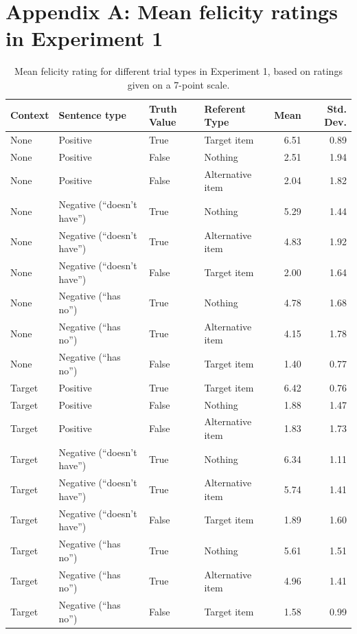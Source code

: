 \documentclass[man, noapacite]{apa2}
\begin{document}
\setlength{\bibleftmargin}{.125in}
\setlength{\bibindent}{-\bibleftmargin}



\newpage
\theappendix

\section{Appendix A: Mean felicity ratings in Experiment 1}\label{appendix:exp1}

\begin{table}[h!]
\caption{\label{tab:m1} Mean felicity rating for different trial types in Experiment 1, based on ratings given on a 7-point scale.}
\begin{center}
\small\addtolength{\tabcolsep}{-5pt}
\begin{tabular}{llllrr}
 \hline
 Context & Sentence type & Truth Value & Referent Type & Mean & Std. Dev. \\
 \hline
 None & Positive & True & Target item & 6.51 & 0.89\\
 None & Positive & False & Nothing & 2.51 & 1.94\\
 None & Positive & False & Alternative item & 2.04 & 1.82\\
 None & Negative (``doesn't have'') & True & Nothing & 5.29 & 1.44\\
 None & Negative (``doesn't have'') & True & Alternative item & 4.83 & 1.92\\
 None & Negative (``doesn't have'') & False & Target item & 2.00 & 1.64\\
 None & Negative (``has no'') & True & Nothing & 4.78 & 1.68\\
 None & Negative (``has no'') & True & Alternative item & 4.15 & 1.78\\
 None & Negative (``has no'') & False & Target item & 1.40 & 0.77\\
 Target & Positive & True & Target item & 6.42 & 0.76\\
 Target& Positive & False & Nothing & 1.88 & 1.47\\
 Target & Positive & False & Alternative item & 1.83 & 1.73\\
 Target & Negative (``doesn't have'') & True & Nothing & 6.34 & 1.11\\
 Target & Negative (``doesn't have'') & True & Alternative item & 5.74 & 1.41\\
 Target & Negative (``doesn't have'') & False & Target item & 1.89 & 1.60\\
 Target & Negative (``has no'') & True & Nothing & 5.61 & 1.51\\
 Target & Negative (``has no'') & True & Alternative item & 4.96 & 1.41\\
 Target & Negative (``has no'') & False & Target item & 1.58 & 0.99\\
  \hline
\end{tabular}
\end{center}
\end{table}
\end{document}
